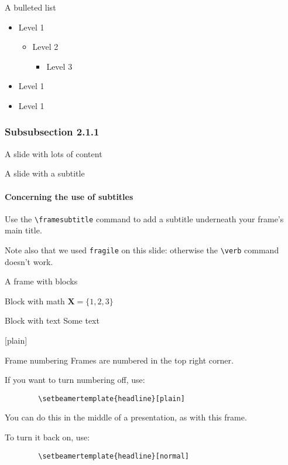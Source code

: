 \documentclass[12pt, t]{beamer}
\begin{document}
\begin{frame}{A bulleted list}
    \begin{itemize}
        \item Level 1
        \begin{itemize}
            \item Level 2
            \begin{itemize}
                \item Level 3
            \end{itemize}
        \end{itemize}
		\item Level 1
		\item Level 1
    \end{itemize}
\end{frame}



\subsubsection{Subsubsection 2.1.1}

\begin{frame}{A slide with lots of content}
    \lipsum[2]
\end{frame}

\begin{frame}[fragile]{A slide with a subtitle}
  \framesubtitle{Concerning the use of subtitles}

  Use the \verb#\framesubtitle# command to add a subtitle
  underneath your frame's main title.

  \vfill

  Note also that we used \verb#fragile# on this slide: otherwise
  the \verb#\verb# command doesn't work.
\end{frame}

\begin{frame}[c]{A frame with blocks}
	\begin{block}{Block with math}
		$\mathbf{X} = \{1, 2, 3\}$
	\end{block}
	\begin{block}{Block with text}
		Some text
	\end{block}
\end{frame}



[plain]

\begin{frame}[fragile]{Frame numbering}
    Frames are numbered in the top right corner.

	If you want to turn numbering off, use:
	\begin{verbatim}
		\setbeamertemplate{headline}[plain]
	\end{verbatim}

	You can do this in the middle of a presentation, as with this frame.

	To turn it back on, use:
	\begin{verbatim}
		\setbeamertemplate{headline}[normal]
	\end{verbatim}
\end{frame}
\end{document}
